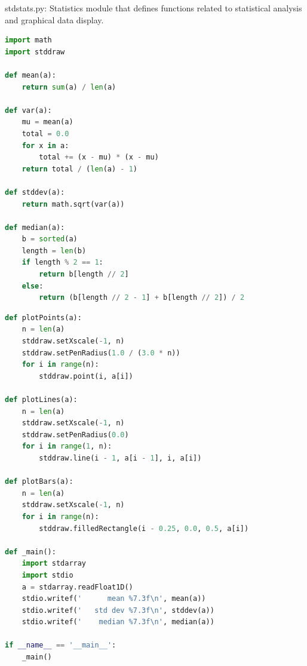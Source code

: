 \documentclass[8pt,a4paper,compress]{beamer}
\begin{document}
\begin{frame}[fragile]
\pause

\begin{framed}
\tiny stdstats.py: Statistics module that defines functions related to statistical analysis and graphical data display.
\end{framed}

\begin{lstlisting}[language=Python]
import math
import stddraw

def mean(a):
    return sum(a) / len(a)

def var(a):
    mu = mean(a)
    total = 0.0
    for x in a:
        total += (x - mu) * (x - mu)
    return total / (len(a) - 1)

def stddev(a):
    return math.sqrt(var(a))

def median(a):
    b = sorted(a)
    length = len(b)
    if length % 2 == 1:
        return b[length // 2]
    else:
        return (b[length // 2 - 1] + b[length // 2]) / 2
\end{lstlisting}
\end{frame}

\begin{frame}[fragile]
\pause

\begin{lstlisting}[language=Python]
def plotPoints(a):
    n = len(a)
    stddraw.setXscale(-1, n)
    stddraw.setPenRadius(1.0 / (3.0 * n))
    for i in range(n):
        stddraw.point(i, a[i])

def plotLines(a):
    n = len(a)
    stddraw.setXscale(-1, n)
    stddraw.setPenRadius(0.0)
    for i in range(1, n):
        stddraw.line(i - 1, a[i - 1], i, a[i])

def plotBars(a):
    n = len(a)
    stddraw.setXscale(-1, n)
    for i in range(n):
        stddraw.filledRectangle(i - 0.25, 0.0, 0.5, a[i])

def _main():
    import stdarray
    import stdio
    a = stdarray.readFloat1D()
    stdio.writef('      mean %7.3f\n', mean(a))
    stdio.writef('   std dev %7.3f\n', stddev(a))
    stdio.writef('    median %7.3f\n', median(a))

if __name__ == '__main__':
    _main()
\end{lstlisting}
\end{frame}
\end{document}

